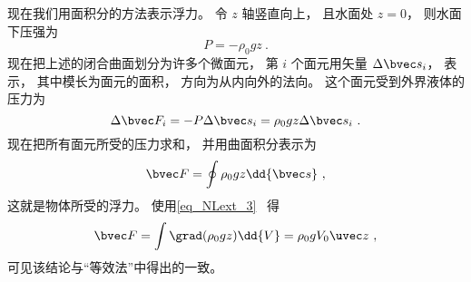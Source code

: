 


现在我们用面积分的方法表示浮力。 令 $z$ 轴竖直向上， 且水面处 $z = 0$， 则水面下压强为
\begin{equation}
P = -\rho_0 g z~.
\end{equation}
现在把上述的闭合曲面划分为许多个微面元， 第 $i$ 个面元用矢量 $\Delta \bvec s_i$， 表示， 其中模长为面元的面积， 方向为从内向外的法向。 这个面元受到外界液体的压力为
\begin{equation}
\Delta \bvec F_i = -P\Delta \bvec s_i = \rho_0 g z \Delta \bvec s_i~.
\end{equation}
现在把所有面元所受的压力求和， 并用曲面积分表示为
\begin{equation}
\bvec F = \oint \rho_0 g z \dd{\bvec s}~,
\end{equation}
这就是物体所受的浮力。 使用\autoref{eq_NLext_3}~ 得
\begin{equation}
\bvec F = \int \grad(\rho_0 g z) \dd{V} = \rho_0 g V_0 \uvec z~,
\end{equation}
可见该结论与“等效法”中得出的一致。
